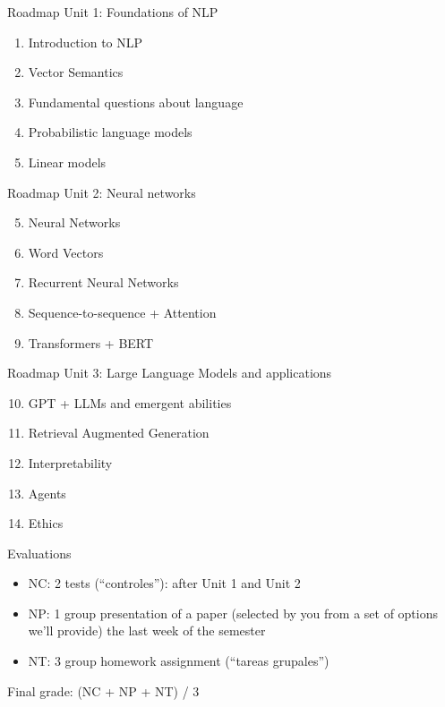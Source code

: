 \documentclass[10pt]{beamer}
\begin{document}
\begin{frame}{Roadmap}
Unit 1: Foundations of NLP
\begin{enumerate}
    \item Introduction to NLP
    \item Vector Semantics
    \item Fundamental questions about language
    \item Probabilistic language models
    \item Linear models
\end{enumerate}
\end{frame}

\begin{frame}{Roadmap}
Unit 2: Neural networks
\begin{enumerate}
\setcounter{enumi}{4}
    \item Neural Networks
    \item Word Vectors
    \item Recurrent Neural Networks
    \item Sequence-to-sequence + Attention
    \item Transformers + BERT
\end{enumerate}
\end{frame}

\begin{frame}{Roadmap}
Unit 3: Large Language Models and applications
\begin{enumerate}
\setcounter{enumi}{9}
    \item GPT + LLMs and emergent abilities
    \item Retrieval Augmented Generation
    \item Interpretability
    \item Agents
    \item Ethics
\end{enumerate}
\end{frame}

\begin{frame}{Evaluations}
\begin{itemize}
    \item NC: 2 tests (``controles''): after Unit 1 and Unit 2
    \item NP: 1 group presentation of a paper (selected by you from a set of options we'll provide) the last week of the semester
    \item NT: 3 group homework assignment (``tareas grupales'')
\end{itemize}
Final grade: (NC + NP + NT) / 3
\end{frame}
\end{document}
